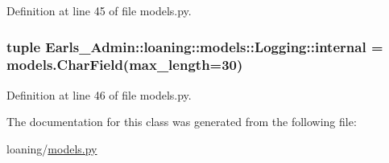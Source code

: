 Definition at line 45 of file models.py.\hypertarget{classEarls__Admin_1_1loaning_1_1models_1_1Logging_6df5e99119a50f3e739c6342970c93ea}{
\subsubsection[internal]{\setlength{\rightskip}{0pt plus 5cm}tuple {\bf Earls\_\-Admin::loaning::models::Logging::internal} = models.CharField(max\_\-length=30)}}
\label{classEarls__Admin_1_1loaning_1_1models_1_1Logging_6df5e99119a50f3e739c6342970c93ea}




Definition at line 46 of file models.py.

The documentation for this class was generated from the following file:\begin{CompactItemize}
\item 
loaning/\hyperlink{loaning_2models_8py}{models.py}\end{CompactItemize}
